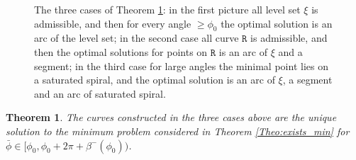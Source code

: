 \documentclass[reqno]{amsart}
\theoremstyle{definition} \newtheorem{definition}{Definition}[section]
\theoremstyle{definition} \newtheorem{remark}[definition]{Remark}
\theoremstyle{plain} \newtheorem{lemma}[definition]{Lemma}
\theoremstyle{plain} \newtheorem{proposition}[definition]{Proposition}
\theoremstyle{plain} \newtheorem{theorem}[definition]{Theorem}
\theoremstyle{plain} \newtheorem{corollary}[definition]{Corollary}
\theoremstyle{definition} \newtheorem{example}[definition]{Example}
\theoremstyle{plain} \newtheorem{claim}[clai]{Claim}
\theoremstyle{definition} \newtheorem{assumption}[definition]{Assumption}
\theoremstyle{definition} \newtheorem{observation}[definition]{Observation}
\newcommand{\1}{\mathbbm 1}
\numberwithin{equation}{section} %
\theoremstyle{plain} \newtheorem*{theorem*}{Theorem}
\theoremstyle{plain} \newtheorem{mthm}[maintheorem]{Main Theorem}
\theoremstyle{plain} \newtheorem*{mthm*}{Main Theorem}
\theoremstyle{plain} \newtheorem*{conjecture*}{Conjecture}
\theoremstyle{plain} \newtheorem{conjecture}[definition]{Conjecture}
\theoremstyle{plain} \newtheorem*{problem*}{Problem}
\begin{document}
\begin{figure}
\resizebox{\textwidth}{!}{}
\caption{The three cases of Theorem \ref{Cor:curve_cal_R_sat_spiral}: in the first picture all level set $\xi$ is admissible, and then for every angle $\geq {\phi_0}$ the optimal solution is an arc of the level set; in the second case all curve $\mathtt R$ is admissible, and then the optimal solutions for points on $\mathtt R$ is an arc of $\xi$ and a segment; in the third case for large angles the minimal point lies on a saturated spiral, and the optimal solution is an arc of $\xi$, a segment and an arc of saturated spiral.}
\label{Fi:three_cases}
\end{figure}

\begin{theorem}
\label{Cor:curve_cal_R_sat_spiral}
The curves constructed in the three cases above are the unique solution to the minimum problem considered in Theorem \ref{Theo:exists_min} for ${\bar \phi} \in [{\phi_0},{\phi_0} + 2\pi + \beta^-({\phi_0}))$.
\end{theorem}
\end{document}
